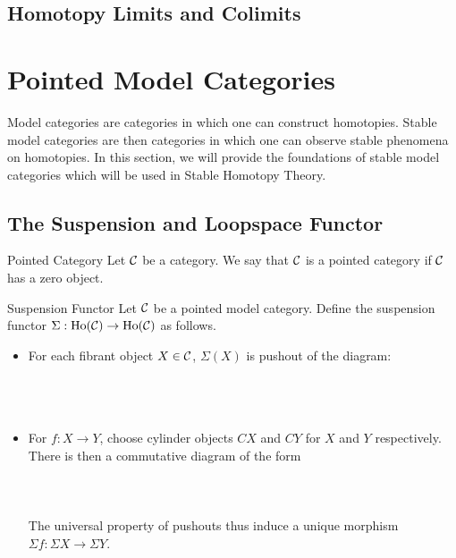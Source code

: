 \documentclass[a4paper]{article}
\begin{document}
\subsection{Homotopy Limits and Colimits}

\pagebreak
\section{Pointed Model Categories}
Model categories are categories in which one can construct homotopies. Stable model categories are then categories in which one can observe stable phenomena on homotopies. In this section, we will provide the foundations of stable model categories which will be used in Stable Homotopy Theory. 

\subsection{The Suspension and Loopspace Functor}
\begin{defn}{Pointed Category}{} Let $\mathcal{C}$ be a category. We say that $\mathcal{C}$ is a pointed category if $\mathcal{C}$ has a zero object. 
\end{defn}

\begin{defn}{Suspension Functor}{} Let $\mathcal{C}$ be a pointed model category. Define the suspension functor $\Sigma:\text{Ho}(\mathcal{C})\to\text{Ho}(\mathcal{C})$ as follows. 
\begin{itemize}
\item For each fibrant object $X\in\mathcal{C}$, $\Sigma(X)$ is pushout of the diagram: \\~\\
\\~\\
\item For $f:X\to Y$, choose cylinder objects $CX$ and $CY$ for $X$ and $Y$ respectively. There is then a commutative diagram of the form \\~\\
\\~\\
The universal property of pushouts thus induce a unique morphism $\Sigma f:\Sigma X\to\Sigma Y$. 
\end{itemize}
\end{defn}
\end{document}
